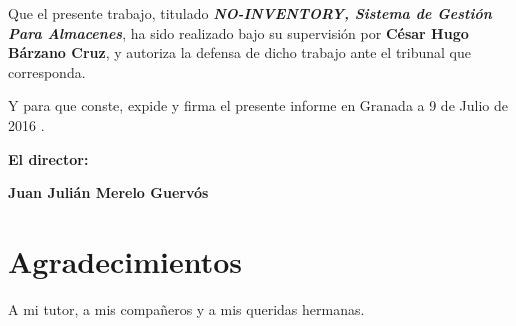 \vspace{0.5cm}

Que el presente trabajo, titulado \textit{\textbf{NO-INVENTORY, Sistema de Gestión Para Almacenes}},
ha sido realizado bajo su supervisión por \textbf{César Hugo Bárzano Cruz}, y autoriza la defensa de dicho trabajo ante el tribunal que corresponda.

\vspace{0.5cm}

Y para que conste, expide y firma el presente informe en Granada a 9 de Julio de 2016 .

\vspace{1cm}

\textbf{El director:}

\vspace{5cm}

\noindent \textbf{Juan Julián Merelo Guervós \ \ \ \ \ }

\chapter*{Agradecimientos}
\thispagestyle{empty}

       \vspace{1cm}


A mi tutor, a mis compañeros y a mis queridas hermanas. 

